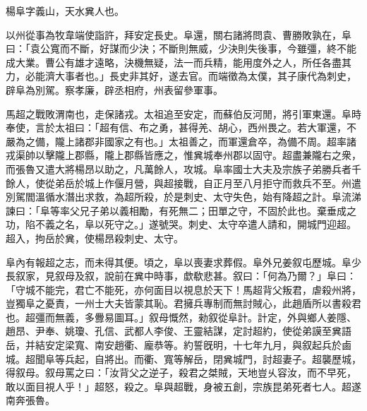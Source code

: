 \begin{pinyinscope}
 
 
 楊阜字義山，天水兾人也。
 
 
 以州從事為牧韋端使詣許，拜安定長史。阜還，關右諸將問袁、曹勝敗孰在，阜曰：「袁公寬而不斷，好謀而少決；不斷則無威，少決則失後事，今雖彊，終不能成大業。曹公有雄才遠略，決機無疑，法一而兵精，能用度外之人，所任各盡其力，必能濟大事者也。」長史非其好，遂去官。而端徵為太僕，其子康代為刺史，辟阜為別駕。察孝廉，辟丞相府，州表留參軍事。
 
 
 
 
 馬超之戰敗渭南也，走保諸戎。太祖追至安定，而蘇伯反河閒，將引軍東還。阜時奉使，言於太祖曰：「超有信、布之勇，甚得羌、胡心，西州畏之。若大軍還，不嚴為之備，隴上諸郡非國家之有也。」太祖善之，而軍還倉卒，為備不周。超率諸戎渠帥以擊隴上郡縣，隴上郡縣皆應之，惟兾城奉州郡以固守。超盡兼隴右之衆，而張魯又遣大將楊昂以助之，凡萬餘人，攻城。阜率國士大夫及宗族子弟勝兵者千餘人，使從弟岳於城上作偃月營，與超接戰，自正月至八月拒守而救兵不至。州遣別駕閻溫循水潛出求救，為超所殺，於是刺史、太守失色，始有降超之計。阜流涕諫曰：「阜等率父兄子弟以義相勵，有死無二；田單之守，不固於此也。棄垂成之功，陷不義之名，阜以死守之。」遂號哭。刺史、太守卒遣人請和，開城門迎超。超入，拘岳於兾，使楊昂殺刺史、太守。
 
 
 
 
 阜內有報超之志，而未得其便。頃之，阜以喪妻求葬假。阜外兄姜叙屯歷城。阜少長叙家，見叙母及叙，說前在兾中時事，歔欷悲甚。叙曰：「何為乃爾？」阜曰：「守城不能完，君亡不能死，亦何面目以視息於天下！馬超背父叛君，虐殺州將，豈獨阜之憂責，一州士大夫皆蒙其恥。君擁兵專制而無討賊心，此趙盾所以書殺君也。超彊而無義，多釁易圖耳。」叙母慨然，勑叙從阜計。計定，外與鄉人姜隱、趙昂、尹奉、姚瓊、孔信、武都人李俊、王靈結謀，定討超約，使從弟謨至兾語岳，并結安定梁寬、南安趙衢、龐恭等。約誓旣明，十七年九月，與叙起兵於鹵城。超聞阜等兵起，自將出。而衢、寬等解岳，閉兾城門，討超妻子。超襲歷城，得叙母。叙母罵之曰：「汝背父之逆子，殺君之桀賊，天地豈乆容汝，而不早死，敢以面目視人乎！」超怒，殺之。阜與超戰，身被五創，宗族昆弟死者七人。超遂南奔張魯。
 

\end{pinyinscope}
